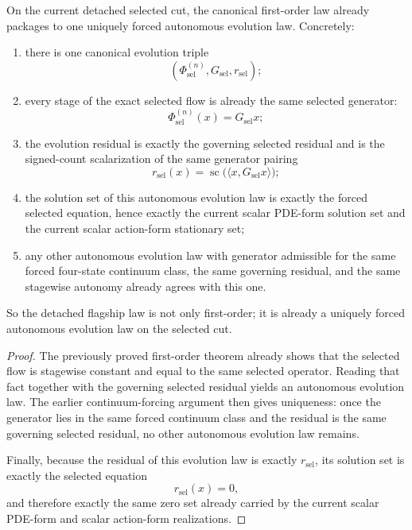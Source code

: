 \begin{theorem}
\label{thm:the-selected-cut-already-carries-one-uniquely-forced-autonomous-evolution-law}
On the current detached selected cut, the canonical first-order law already
packages to one uniquely forced autonomous evolution law. Concretely:
\begin{enumerate}
\item there is one canonical evolution triple
\[
(\Phi_{\mathrm{sel}}^{(n)},G_{\mathrm{sel}},r_{\mathrm{sel}});
\]
\item every stage of the exact selected flow is already the same selected
      generator:
\[
\Phi_{\mathrm{sel}}^{(n)}(x)=G_{\mathrm{sel}}x;
\]
\item the evolution residual is exactly the governing selected residual and is
      the signed-count scalarization of the same generator pairing
\[
r_{\mathrm{sel}}(x)=\operatorname{sc}\!\bigl(\langle x,G_{\mathrm{sel}}x\rangle\bigr);
\]
\item the solution set of this autonomous evolution law is exactly the forced
      selected equation, hence exactly the current scalar PDE-form solution set
      and the current scalar action-form stationary set;
\item any other autonomous evolution law with generator admissible for the
      same forced four-state continuum class, the same governing residual, and
      the same stagewise autonomy already agrees with this one.
\end{enumerate}
So the detached flagship law is not only first-order; it is already a
uniquely forced autonomous evolution law on the selected cut.
\end{theorem}

\begin{proof}
The previously proved first-order theorem already shows that the selected flow
is stagewise constant and equal to the same selected operator. Reading that
fact together with the governing selected residual yields an autonomous
evolution law. The earlier continuum-forcing argument then gives uniqueness:
once the generator lies in the same forced continuum class and the residual is
the same governing selected residual, no other autonomous evolution law
remains.

Finally, because the residual of this evolution law is exactly
\(r_{\mathrm{sel}}\), its solution set is exactly the selected equation
\[
r_{\mathrm{sel}}(x)=0,
\]
and therefore exactly the same zero set already carried by the current scalar
PDE-form and scalar action-form realizations.
\end{proof}

